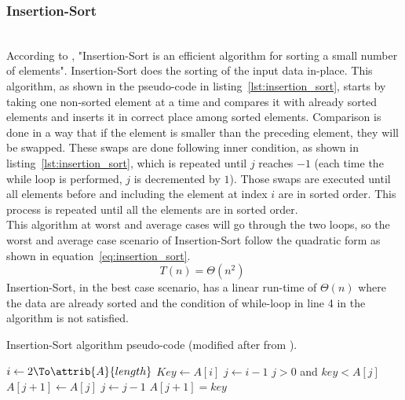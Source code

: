 \documentclass[sigconf, nonacm, natbib, screen, balance=False]{acmart}
\begin{document}
\subsubsection{Insertion-Sort}\label{sec:insertion_sort}
\hfill\\
According to \citet{CLRS_2009}, "Insertion-Sort is an efficient algorithm for sorting a small number of elements". Insertion-Sort does the sorting of the input data in-place. This algorithm, as shown in the pseudo-code in listing~\ref{lst:insertion_sort}, starts by taking one non-sorted element at a time and compares it with already sorted elements and inserts it in correct place among sorted elements. Comparison is done in a way that if the element is smaller than the preceding element, they will be swapped. These swaps are done following inner condition, as shown in listing~\ref{lst:insertion_sort}, which is repeated until $j$ reaches $-1$ (each time the while loop is performed, $j$ is decremented by $1$). Those swaps are executed until all elements before and including the element at index $i$ are in sorted order. This process is repeated until all the elements are in sorted order. 
\hfill\\
This algorithm at worst and average cases will go through the two loops, so the worst and average case scenario of Insertion-Sort follow the quadratic form as shown in equation~\ref{eq:insertion_sort}.
\begin{equation}
  T(n) = \Theta(n^2) \; \label{eq:insertion_sort}
\end{equation}
Insertion-Sort, in the best case scenario, has a linear run-time of $\Theta(n)$ where the data are already sorted and the condition of while-loop in line 4 in the algorithm is not satisfied.

\begin{listing}
  \caption{Insertion-Sort algorithm pseudo-code (modified after from \citet[Ch.~2.1]{CLRS_2009}).}
  \label{lst:insertion_sort}
  \begin{codebox}
    \li \For $i \gets 2 \To \attrib{A}{length}$ 
    \Do
    \li $Key \gets A[i]$
    \li $j \gets  i-1$
    \li \While $j > 0$ and $key < A[j]$
    \Do
    \li $A[j+1] \gets A[j] $
    \li $j \gets j-1$
    \End
    \li $A[j+1] = key$
    \End
  \end{codebox}
\end{listing}
\end{document}
